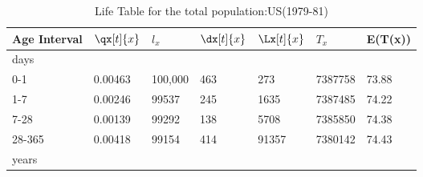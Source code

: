 \begin{table}[!h]
\caption{Life Table for the total population:US(1979-81)}
\centering
\begin{tabular}{|l|l|l|l|l|l|l|}
\hline
Age Interval                                  & $\qx[t]{x}$                                           & $l_x$                                            & $\dx[t]{x}$                                           & $\Lx[t]{x}$                                           & $T_x$                                            & E(T(x))                                       \\ \hline
days                                          &                                               &                                               &                                               &                                               &                                               &                                               \\ \hline
0-1                                           & 0.00463                                       & 100,000                                       & 463                                           & 273                                           & 7387758                                       & 73.88                                         \\ \hline
1-7                                           & 0.00246                                       & 99537                                         & 245                                           & 1635                                          & 7387485                                       & 74.22                                         \\ \hline
7-28                                          & 0.00139                                       & 99292                                         & 138                                           & 5708                                          & 7385850                                       & 74.38                                         \\ \hline
28-365                                        & 0.00418                                       & 99154                                         & 414                                           & 91357                                         & 7380142                                       & 74.43                                         \\ \hline
years                                         &                                               &                                               &                                               &                                               &                                               &                                               \\ \hline

\end{tabular}
\end{table}
